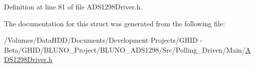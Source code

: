 \-Definition at line 81 of file \-A\-D\-S1298\-Driver.\-h.



\-The documentation for this struct was generated from the following file\-:\begin{DoxyCompactItemize}
\item 
/\-Volumes/\-Data\-H\-D\-D/\-Documents/\-Development Projects/\-G\-H\-I\-D -\/ Beta/\-G\-H\-I\-D/\-B\-L\-U\-N\-O\-\_\-\-Project/\-B\-L\-U\-N\-O\-\_\-\-A\-D\-S1298/\-Src/\-Polling\-\_\-\-Driven/\-Main/\hyperlink{_a_d_s1298_driver_8h}{\-A\-D\-S1298\-Driver.\-h}\end{DoxyCompactItemize}
